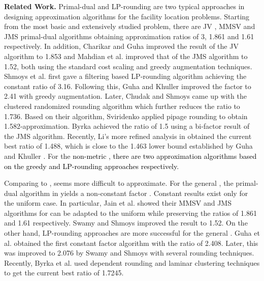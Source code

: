 \documentclass[10pt]{llncs}
\begin{document}
\textbf{Related Work.} Primal-dual and LP-rounding are two typical
approaches in designing approximation algorithms for the facility
location problems. Starting from the most basic and extensively studied
 problem, there are JV \cite{jain01approximation}, MMSV \cite{Mohammad1.861}
and JMS \cite{Jain02greedy} primal-dual algorithms obtaining approximation
ratios of 3, 1.861 and 1.61 respectively. In addition, Charikar and
Guha \cite{Charikar051.7281.853} improved the result of the JV algorithm
to 1.853 and Mahdian et al. \cite{Mohammad06FLP} improved that of
the JMS algorithm to 1.52, both using the standard cost scaling and
greedy augmentation techniques. Shmoys et al. \cite{Shmoys97FL} first
gave a filtering based LP-rounding algorithm achieving the constant
ratio of 3.16. Following this, Guha and Khuller \cite{Guha99greedy}
improved the factor to 2.41 with greedy augmentation. Later, Chudak
and Shmoys \cite{Chudak0312e} came up with the clustered randomized
rounding algorithm which further reduces the ratio to 1.736. Based
on their algorithm, Sviridenko \cite{Sviridenko02improved1.58} applied
pipage rounding to obtain 1.582-approximation. Byrka \cite{jaroslaw2010optimal}
achieved the ratio of 1.5 using a bi-factor result of the JMS algorithm.
Recently, Li's more refined analysis in \cite{Li2011} obtained the
current best ratio of 1.488, which is close to the 1.463 lower bound
established by Guha and Khuller \cite{Guha99greedy}. For the \textcolor{black}{non-metric
, there are two  approximation algorithms
\cite{Hochbaum-1982,Lin92filting} based on the greedy and LP-rounding
approaches respectively.}

Comparing to ,  seems more difficult to approximate.
For the general , the primal-dual algorithm in \cite{Jain00FTFL}
yields a non-constant factor \textcolor{black}{}.
Constant results exist only for the uniform case. In particular, Jain
et al. \cite{Jain03dualfitting,MohammadThesis2004} showed their MMSV
and JMS algorithms for  can be adapted to the uniform 
while preserving the ratios of 1.861 and 1.61 respectively. Swamy
and Shmoys \cite{Swamy08FTFL2.076} improved the result to 1.52. On
the other hand, LP-rounding approaches are more successful for the
general . Guha et al. \cite{Guha03FTFL2.41} obtained the first
constant factor algorithm with the ratio of 2.408. Later, this was
improved to 2.076 by Swamy and Shmoys \cite{Swamy08FTFL2.076} with
several rounding techniques. Recently, Byrka et al. \cite{JaroslawFTFL1.725}
used dependent rounding and laminar clustering techniques to get the
current best ratio of 1.7245.
\end{document}
